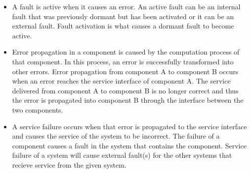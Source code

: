 \begin{itemize}
\item A fault is active when it causes an error. An active fault can be an internal fault that was previously dormant but has been activated or it can be an external fault. Fault activation is what causes a dormant fault to become active. 

\item Error propagation in a component is caused by the computation process of that component. In this process, an error is successfully transformed into other errors. Error propagation from component A to component B occurs when an error reaches the service interface of component A. The service delivered from component A to component B is no longer correct and thus the error is propagated into component B through the interface between the two components.

\item A service failure occurs when that error is propagated to the service interface and causes the service of the system to be incorrect. The failure of a component causes a fault in the system that contains the component. Service failure of a system will cause external fault(s) for the other systems that recieve service from the given system. 
\end{itemize}